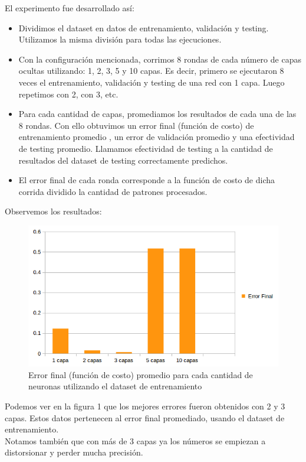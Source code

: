 El experimento fue desarrollado así: 
\begin{itemize}
\item Dividimos el dataset en datos de entrenamiento, validación y testing. Utilizamos la misma división para todas las ejecuciones.
\item Con la configuración mencionada, corrimos 8 rondas de cada número de capas ocultas utilizando: 1, 2, 3, 5 y 10 capas.
Es decir, primero se ejecutaron 8 veces el entrenamiento, validación y testing de una red con 1 capa. Luego repetimos con 2, con 3, etc.
\item Para cada cantidad de capas, promediamos los resultados de cada una de las 8 rondas. Con ello obtuvimos un error final (función de costo) de entrenamiento promedio , un error de validación promedio y una efectividad de testing promedio. Llamamos efectividad de testing a la cantidad de resultados del dataset de testing correctamente predichos.

\item El error final de cada ronda corresponde a la función de costo de dicha corrida dividido la cantidad de patrones procesados.
\end{itemize}

Observemos los resultados:\\

\begin{figure}[h]
  \begin{center}
  \includegraphics[scale=0.75]{graficos/fig1_cant_capas_error_final.png}
  \caption{Error final (función de costo) promedio para cada cantidad de neuronas utilizando el dataset de entrenamiento}
  \end{center}
\end{figure}

Podemos ver en la figura 1 que los mejores errores fueron obtenidos con 2 y 3 capas. Estos datos pertenecen al error final promediado, usando el dataset de entrenamiento.\\
Notamos también que con más de 3 capas ya los números se empiezan a distorsionar y perder mucha precisión.

